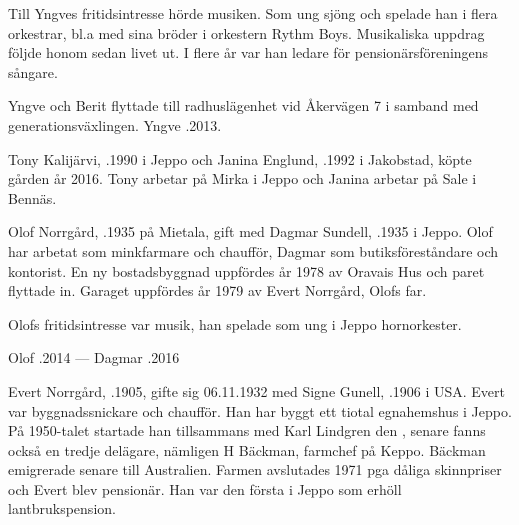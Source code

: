 Till Yngves fritidsintresse hörde musiken. Som ung sjöng och spelade han i flera orkestrar, bl.a med sina bröder i orkestern Rythm Boys. Musikaliska uppdrag följde honom sedan livet ut. I flere år var han ledare för pensionärsföreningens sångare.

Yngve och Berit flyttade till radhuslägenhet vid Åkervägen 7 i samband med generationsväxlingen. Yngve .2013.



%



%
Tony Kalijärvi, .1990 i Jeppo och Janina Englund, .1992 i Jakobstad, köpte gården år 2016. Tony arbetar på Mirka i Jeppo och Janina arbetar på Sale i Bennäs.


%
Olof Norrgård, .1935 på Mietala, gift med Dagmar Sundell, .1935  i Jeppo. Olof har arbetat som minkfarmare och chaufför, Dagmar som butiksföreståndare och kontorist. En ny bostadsbyggnad uppfördes år 1978 av Oravais Hus och paret flyttade in. Garaget uppfördes år 1979 av Evert Norrgård, Olofs far.

Olofs fritidsintresse var musik, han spelade som ung i Jeppo hornorkester.

Olof .2014  ---  Dagmar .2016



%



%
Evert Norrgård, .1905, gifte sig 06.11.1932 med Signe Gunell, .1906 i USA. Evert var byggnadssnickare och chaufför. Han har byggt ett tiotal egnahemshus i Jeppo. På 1950-talet startade han tillsammans med Karl Lindgren den , senare fanns också en tredje delägare, nämligen H Bäckman, farmchef på Keppo. Bäckman emigrerade senare till Australien. Farmen avslutades 1971 pga dåliga skinnpriser och Evert blev pensionär. Han var den första i Jeppo som erhöll lantbrukspension.

